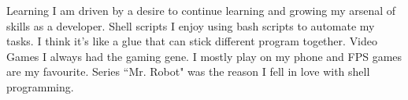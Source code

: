 



\begin{cvskills}

    \cvskill
    {Learning} %
    {I am driven by a desire to continue learning and growing my arsenal of skills as a developer.} %
  \cvskill
    {Shell scripts} %
    {I enjoy using bash scripts to automate my tasks. I think it's like a glue that can stick different program together.} %
  \cvskill
    {Video Games} %
    {I always had the gaming gene. I mostly play on my phone and FPS games are my favourite.} %
  \cvskill
    {Series}
    {“Mr. Robot" was the reason I fell in love with shell programming.}
\end{cvskills}